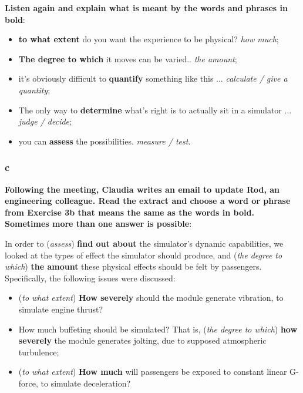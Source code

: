\textbf{Listen again and explain what is meant by the words and phrases in bold}:

\begin{itemize}

\item \textbf{to what extent} do you want the experience to be physical? \textit{how much};
\item \textbf{The degree to which} it moves can be varied.. \textit{the amount};
\item it's obviously difficult to \textbf{quantify} something like this ... \textit{calculate / give a quantity};
\item The only way to \textbf{determine} what's right is to actually sit in a simulator ... \textit{judge / decide};
\item you can \textbf{assess} the possibilities. \textit{measure / test}.

\end{itemize}

\subsubsection{c}

\textbf{Following the meeting, Claudia writes an email to update Rod, an engineering colleague. Read the extract and choose a word or phrase from Exercise 3b that means the same as the words in bold. Sometimes more than one answer is possible}:

In order to (\textit{assess}) \textbf{find out about} the simulator's dynamic capabilities, we looked at the types of effect the simulator should produce, and (\textit{the degree to which}) \textbf{the amount} these physical effects should be felt by passengers. Specifically, the following issues were discussed:

\begin{itemize}

\item (\textit{to what extent}) \textbf{How severely} should the module generate vibration, to simulate engine thrust?
\item How much buffeting should be simulated? That is, (\textit{the degree to which}) \textbf{how severely} the module generates jolting, due to supposed atmospheric turbulence;
\item (\textit{to what extent}) \textbf{How much} will passengers be exposed to constant linear G-force, to simulate deceleration?

\end{itemize}


